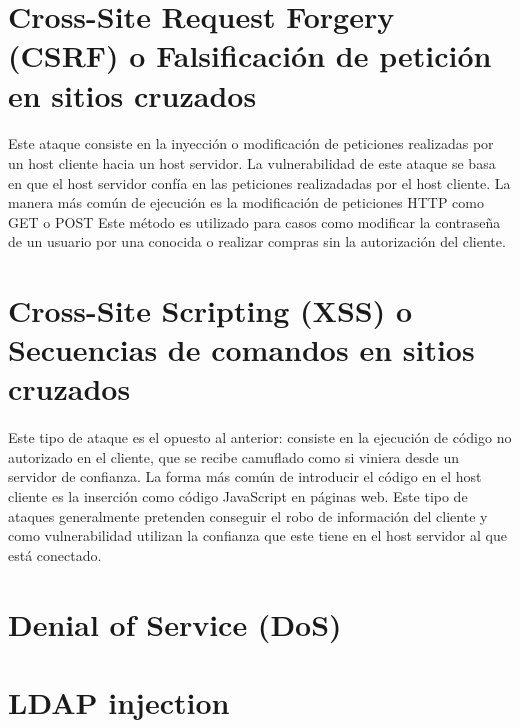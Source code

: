 \documentclass[10pt, a4paper,spanish]{article}
\begin{document}
    \section{Cross-Site Request Forgery (CSRF) o Falsificación de petición en sitios cruzados}
        \paragraph{}
		Este ataque consiste en la inyección o modificación de peticiones realizadas por un host cliente hacia un host servidor. La vulnerabilidad de este ataque se basa en que el host servidor confía en las peticiones realizadadas por el host cliente. La manera más común de ejecución es la modificación de peticiones HTTP como GET o POST Este método es utilizado para casos como modificar la contraseña de un usuario por una conocida o realizar compras sin la autorización del cliente.


    \section{Cross-Site Scripting (XSS) o Secuencias de comandos en sitios cruzados}
        \paragraph{}
		Este tipo de ataque es el opuesto al anterior: consiste en la ejecución de código no autorizado en el cliente, que se recibe camuflado como si viniera desde un servidor de confianza. La forma más común de introducir el código en el host cliente es la inserción como código JavaScript en páginas web. Este tipo de ataques generalmente pretenden conseguir el robo de información del cliente y como vulnerabilidad utilizan la confianza que este tiene en el host servidor al que está conectado.


    \section{Denial of Service (DoS)}
        \paragraph{}


    \section{LDAP injection}
        \paragraph{}
\end{document}
